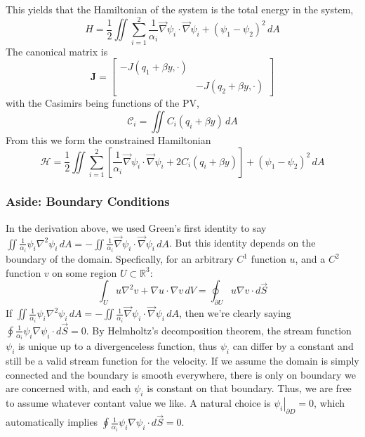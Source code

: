 \documentclass[12pt]{article}
\begin{document}
{{        This yields that the Hamiltonian of the system is the total energy in the system,
        $$
        H = \frac12 \iint \sum_{i=1}^2 \frac{1}{\alpha_i}\vec\nabla \psi_i \cdot \vec\nabla \psi_i + (\psi_1 - \psi_2)^2 \, dA
        $$
        The canonical matrix is
        $$
        \mathbf{J} = \left[\begin{array}{cc}
        -J(q_1 + \beta y, \cdot) & \\
        & -J(q_2 + \beta y, \cdot)
        \end{array}\right]
        $$
        with the Casimirs being functions of the PV,
        $$
        \mathcal{C}_i = \iint C_i(q_i + \beta y) \, dA
        $$
        From this we form the constrained Hamiltonian
        \begin{equation}
            \mathcal{H} = \frac12 \iint \sum_{i=1}^2 \left[ \frac{1}{\alpha_i} \vec\nabla \psi_i \cdot \vec\nabla \psi_i + 2C_i(q_i + \beta y) \right]+ (\psi_1 - \psi_2)^2 \, dA
            \label{eqn:qg_tl_h}
        \end{equation}

        \subsubsection{Aside: Boundary Conditions}{
            In the derivation above, we used Green's first identity to say $\iint \frac{1}{\alpha_i}\psi_i \nabla^2 \psi_i \, dA = - \iint \frac{1}{\alpha_i} \vec\nabla\psi_i \cdot \vec\nabla\psi_i \, dA$. But this identity depends on the boundary of the domain. Specfically, for an arbitrary $C^1$ function $u$, and a $C^2$ function $v$ on some region $U \subset \mathbb{R}^3$:
            $$
            \int_U u \nabla^2 v + \nabla u \cdot \nabla v \, dV = \oint_{\partial U} u \nabla v \cdot d \vec S
            $$
            If $\iint \frac{1}{\alpha_i}\psi_i \nabla^2 \psi_i \, dA = - \iint \frac{1}{\alpha_i} \vec\nabla\psi_i \cdot \vec\nabla\psi_i \, dA$, then we're clearly saying $\oint \frac{1}{\alpha_i}\psi_i \nabla \psi_i\cdot d \vec S = 0$. By Helmholtz's decomposition theorem, the stream function $\psi_i$ is unique up to a divergenceless function, thus $\psi_i$ can differ by a constant and still be a valid stream function for the velocity. If we assume the domain is simply connected and the boundary is smooth everywhere, there is only on boundary we are concerned with, and each $\psi_i$ is constant on that boundary. Thus, we are free to assume whatever contant value we like. A natural choice is $\left. \psi_i \right|_{\partial D} = 0$, which automatically implies $\oint \frac{1}{\alpha_i}\psi_i \nabla \psi_i \cdot d \vec S = 0$.

}}}
\end{document}
